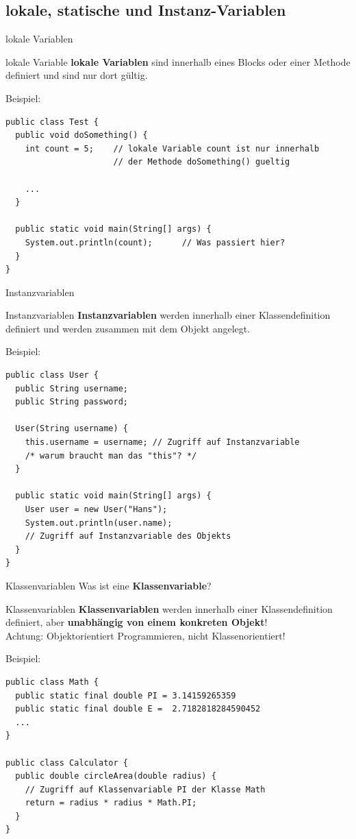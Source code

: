 \documentclass[18pt]{beamer}
\begin{document}
\subsection{lokale, statische und Instanz-Variablen}
\begin{frame}[fragile]{lokale Variablen}
	\begin{block}{lokale Variable}
    \textbf{lokale Variablen} sind innerhalb eines Blocks oder einer Methode definiert und sind nur dort gültig.
  \end{block}
  Beispiel:
    \begin{lstlisting}
public class Test {   
  public void doSomething() {
    int count = 5;    // lokale Variable count ist nur innerhalb 
                      // der Methode doSomething() gueltig
    
    ...
  }
  
  public static void main(String[] args) {
    System.out.println(count);      // Was passiert hier?
  }
}\end{lstlisting}
\end{frame}

\begin{frame}[fragile]{Instanzvariablen}
	\begin{block}{Instanzvariablen}
    \textbf{Instanzvariablen} werden innerhalb einer Klassendefinition definiert und werden zusammen mit dem Objekt angelegt.
  \end{block}
  Beispiel:
    \begin{lstlisting}
public class User {   
  public String username;
  public String password;
  
  User(String username) {
    this.username = username; // Zugriff auf Instanzvariable
    /* warum braucht man das "this"? */
  }
  
  public static void main(String[] args) {
    User user = new User("Hans");
    System.out.println(user.name);
    // Zugriff auf Instanzvariable des Objekts
  }
}\end{lstlisting}
\end{frame}

\begin{frame}[fragile]{Klassenvariablen}
  Was ist eine \textbf{Klassenvariable}?
  \pause
	\begin{block}{Klassenvariablen}
    \textbf{Klassenvariablen} werden innerhalb einer Klassendefinition definiert, aber \textbf{unabhängig von einem konkreten Objekt}!\\
    \pause
    \textcolor[rgb]{1,0,0}{Achtung: Objektorientiert Programmieren, nicht Klassenorientiert!}
  \end{block}
  Beispiel:
    \begin{lstlisting}
public class Math {   
  public static final double PI = 3.14159265359
  public static final double E =  2.7182818284590452
  ...
}

public class Calculator {
  public double circleArea(double radius) {
    // Zugriff auf Klassenvariable PI der Klasse Math
    return = radius * radius * Math.PI;
  }
}\end{lstlisting}
\end{frame}
\end{document}
